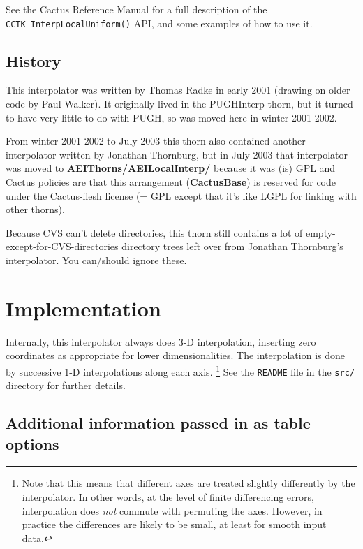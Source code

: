 See the Cactus Reference Manual
for a full description of the \verb|CCTK_InterpLocalUniform()| API,
and some examples of how to use it.


\subsection{History}

This interpolator was written by Thomas Radke in early 2001 (drawing
on older code by Paul Walker).  It originally lived in the PUGHInterp
thorn, but it turned to have very little to do with PUGH, so was moved
here in winter 2001-2002.

From winter 2001-2002 to July 2003 this thorn also contained another
interpolator written by Jonathan Thornburg, but in July 2003 that
interpolator was moved to {\bf AEIThorns/AEILocalInterp/} because it was
(is) GPL and Cactus policies are that this arrangement ({\bf CactusBase})
is reserved for code under the Cactus-flesh license (= GPL except
that it's like LGPL for linking with other thorns).

Because CVS can't delete directories, this thorn still contains a lot
of empty-except-for-CVS-directories directory trees left over from
Jonathan Thornburg's interpolator.  You can/should ignore these.


\section{Implementation}

Internally, this interpolator always does 3-D interpolation, inserting
zero coordinates as appropriate for lower dimensionalities.  The
interpolation is done by successive 1-D interpolations along each
axis.%
\footnote{%
	 Note that this means that different axes are treated
	 slightly differently by the interpolator.  In other
	 words, at the level of finite differencing errors,
	 interpolation does {\em not\/} commute with permuting
	 the axes.  However, in practice the differences are
	 likely to be small, at least for smooth input data.
	 }%
{}  See the \verb|README| file in the \verb|src/| directory
for further details.

\subsection{Additional information passed in as table options}

